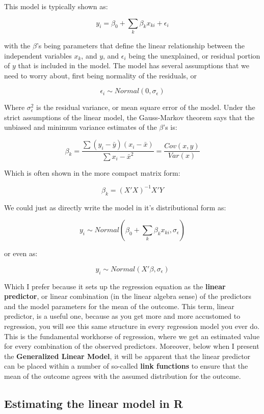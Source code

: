 \documentclass[
]{article}
\begin{document}
This model is typically shown as:

\[y_i = \beta_0 +\sum_k \beta_k x_{ki} + \epsilon_i\]

with the \(\beta\)'s being parameters that define the linear relationship between the independent variables \(x_k\), and \(y\), and \(\epsilon_i\) being the unexplained, or residual portion of \(y\) that is included in the model. The model has several assumptions that we need to worry about, first being normality of the residuals, or

\[\epsilon_i \sim Normal(0, \sigma_\epsilon)\]

Where \(\sigma_\epsilon ^2\) is the residual variance, or mean square error of the model. Under the strict assumptions of the linear model, the Gauss-Markov theorem says that the unbiased and minimum variance estimates of the \(\beta\)'s is:

\[
\beta_k = \frac{\sum (y_i - \bar{y})(x_i - \bar{x})}{\sum x_i - \bar{x}^2} = \frac{Cov(x,y)}{Var(x)}
\]

Which is often shown in the more compact matrix form:

\[\beta_k = (X'X)^{-1} X'Y\]

We could just as directly write the model in it's distributional form as:

\[
y_i \sim Normal(\beta_0 +\sum_k \beta_k x_{ki}, \sigma_\epsilon)
\]

or even as:

\[
y_i \sim Normal(X' \beta, \sigma_\epsilon)
\]

Which I prefer because it sets up the regression equation as the \textbf{linear predictor}, or linear combination (in the linear algebra sense) of the predictors and the model parameters for the mean of the outcome. This term, linear predictor, is a useful one, because as you get more and more accustomed to regression, you will see this same structure in every regression model you ever do. This is the fundamental workhorse of regression, where we get an estimated value for every combination of the observed predictors. Moreover, below when I present the \textbf{Generalized Linear Model}, it will be apparent that the linear predictor can be placed within a number of so-called \textbf{link functions} to ensure that the mean of the outcome agrees with the assumed distribution for the outcome.

\hypertarget{estimating-the-linear-model-in-r}{%
\subsection{Estimating the linear model in R}\label{estimating-the-linear-model-in-r}}
\end{document}
